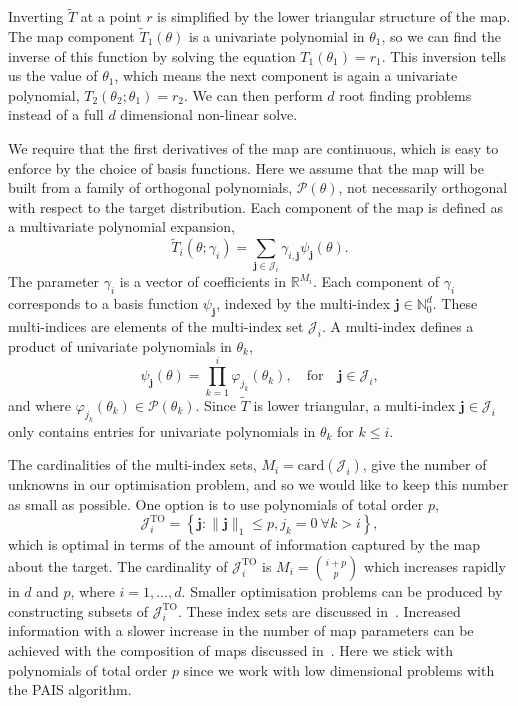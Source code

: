 \documentclass[final]{siamltex}
\begin{document}
Inverting $\tilde{T}$ at a point $r$ is simplified by the lower triangular structure of the map. The map component $\tilde{T}_1(\theta)$ is a univariate polynomial in $\theta_1$, so we can find the inverse of this function by solving the equation $T_1(\theta_1) = r_1$. This inversion tells us the value of $\theta_1$, which means the next component is again a univariate polynomial, $T_2(\theta_2; \theta_1)=r_2$. We can then perform $d$ root finding problems instead of a full $d$ dimensional non-linear solve.

We require that the first derivatives of the map are continuous, which is easy to enforce by the choice of basis functions. Here we assume that the map will be built from a family of orthogonal polynomials, $\mathcal{P}(\theta)$, not necessarily orthogonal with respect to the target distribution. Each component of the map is defined as a multivariate polynomial expansion,
\begin{equation}\label{eq:map_defn}
	\tilde{T}_i(\theta; \gamma_i) = \sum\limits_{\mathbf{j}\in\mathcal{J}_i} \!
\gamma_{i,\mathbf{j}}\psi_\mathbf{j}(\theta).
\end{equation}
The parameter $\gamma_i$ is a vector of coefficients in $\mathbb{R}^{M_i}$. Each component of $\gamma_i$ corresponds to a basis function
$\psi_\mathbf{j}$, indexed by the multi-index $\mathbf{j} \in \mathbb{N}_0^d$. These multi-indices are elements of the multi-index set $\mathcal{J}_i$. A multi-index defines a product of univariate polynomials in $\theta_k$,
\[
	\psi_\mathbf{j}(\theta) = \prod\limits_{k=1}^i \! \varphi_{j_k}(\theta_k), \quad \text{for} \quad \mathbf{j} \in \mathcal{J}_i,
\]
and where $\varphi_{j_k}(\theta_k) \in \mathcal{P}(\theta_k)$. Since $\tilde{T}$ is lower triangular, a multi-index $\mathbf{j}\in\mathcal{J}_i$ only contains entries for univariate polynomials in $\theta_k$ for $k\leq i$.

The cardinalities of the multi-index sets, $M_i = \text{card}(\mathcal{J}_i)$, give the number of unknowns in our
optimisation problem, and so we would like to keep this number as small as possible. One option is
to use polynomials of total order $p$,
\[
	\mathcal{J}_i^\text{TO} = \left\{\mathbf{j}:\|\mathbf{j}\|_1 \leq p, j_k = 0\ \forall k > i\right\},
\]
which is optimal in terms of the amount of information captured by the map about the target. The cardinality of $\mathcal{J}_i^\text{TO}$ is $M_i = {i+p \choose p}$ which increases rapidly in $d$ and $p$, where $i = 1, \dots, d$. Smaller optimisation problems can be produced by constructing subsets of $\mathcal{J}_i^\text{TO}$. These index sets are discussed
in~\cite{parno2014transport}. Increased information with a slower increase in the number of map parameters can be achieved with the composition of maps discussed in~\cite{parno2015transport}. Here we stick with polynomials of total order $p$ since we work with low dimensional problems with the PAIS algorithm.
\end{document}

